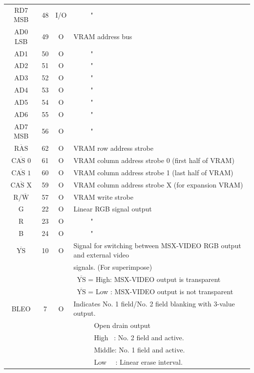 \documentclass[a4paper,10pt]{article}
\begin{document}
\begin{tabular}{|c|c|c|l|}
RD7 MSB & 48 & I/O & \ \ \ \ \ "\\[-1.04em]
AD0 LSB & 49 & O & VRAM address bus\\[-1.04em]
AD1 & 50 & O & \ \ \ \ \ "\\[-1.04em]
AD2 & 51 & O & \ \ \ \ \ "\\[-1.04em]
AD3 & 52 & O & \ \ \ \ \ "\\[-1.04em]
AD4 & 53 & O & \ \ \ \ \ "\\[-1.04em]
AD5 & 54 & O & \ \ \ \ \ "\\[-1.04em]
AD6 & 55 & O & \ \ \ \ \ "\\[-1.04em]
AD7 MSB & 56 & O & \ \ \ \ \ "\\[-1.04em]
$\overline{\mbox{RAS}}$ & 62 & O & VRAM row address strobe\\[-1.04em]
$\overline{\mbox{CAS 0}}$ & 61 & O & VRAM column address strobe 0 (first half of VRAM)\\[-1.04em]
$\overline{\mbox{CAS 1}}$ & 60 & O & VRAM column address strobe 1 (last half of VRAM)\\[-1.04em]
$\overline{\mbox{CAS X}}$ & 59 & O & VRAM column address strobe X (for expansion VRAM)\\[-1.04em]
R/$\overline{\mbox{W}}$ & 57 & O & VRAM write strobe\\[-1.04em]
G & 22 & O & Linear RGB signal output\\[-1.04em]
R & 23 & O & \ \ \ \ \ "\\[-1.04em]
B & 24 & O & \ \ \ \ \ "\\[-1.04em]
$\overline{\mbox{YS}}$ & 10 & O & Signal for switching between MSX-VIDEO RGB output and external video\\[-1.04em]
& & & signals. (For superimpose)\\[-1.04em]
& & & \ $\overline{\mbox{YS}}$ = High: MSX-VIDEO output is transparent\\[-1.04em]
& & & \ $\overline{\mbox{YS}}$ = Low : MSX-VIDEO output is not transparent\\[-1.04em]
BLEO & 7 & O & Indicates No. 1 field/No. 2 field blanking with 3-value output.\\[-1.04em]
& & & \ \ \ \ \ \ Open drain output\\[-1.04em]
& & & \ \ \ \ \ \ High \ : No. 2 field and active.\\[-1.04em]
& & & \ \ \ \ \ \ Middle: No. 1 field and active.\\[-1.04em]
& & & \ \ \ \ \ \ Low \ \ : Linear erase interval.\\
\hline
\end{tabular}
\end{document}
